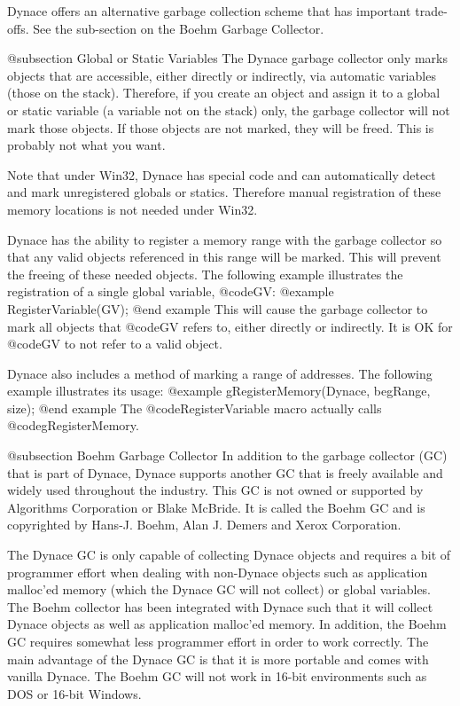 Dynace offers an alternative garbage collection scheme that has important
trade-offs.  See the sub-section on the Boehm Garbage Collector.



@subsection Global or Static Variables
The Dynace garbage collector only marks objects that are accessible, either
directly or indirectly, via automatic variables (those on the stack).
Therefore, if you create an object and assign it to a global or static
variable (a variable not on the stack) only, the garbage collector will
not mark those objects.  If those objects are not marked, they will be
freed.  This is probably not what you want.

Note that under Win32, Dynace has special code and can automatically
detect and mark unregistered globals or statics.  Therefore manual
registration of these memory locations is not needed under Win32.

Dynace has the ability to register a memory range with the garbage collector
so that any valid objects referenced in this range will be marked.  This
will prevent the freeing of these needed objects.  The following example
illustrates the registration of a single global variable, @code{GV}:
@example
        RegisterVariable(GV);
@end example
This will cause the garbage collector to mark all objects that @code{GV}
refers to, either directly or indirectly.  It is OK for @code{GV} to not
refer to a valid object.

Dynace also includes a method of marking a range of addresses.  The following
example illustrates its usage:
@example
        gRegisterMemory(Dynace, begRange, size);
@end example
The @code{RegisterVariable} macro actually calls @code{gRegisterMemory}.




@subsection Boehm Garbage Collector
In addition to the garbage collector (GC) that is part of Dynace,
Dynace supports another GC that is freely available and widely used
throughout the industry.  This GC is not owned or supported by
Algorithms Corporation or Blake McBride.  It is called the Boehm GC and is
copyrighted by Hans-J. Boehm, Alan J. Demers and Xerox Corporation.

The Dynace GC is only capable of collecting Dynace objects and requires
a bit of programmer effort when dealing with non-Dynace objects such as
application malloc'ed memory (which the Dynace GC will not collect) or
global variables.  The Boehm collector has been integrated with Dynace
such that it will collect Dynace objects as well as application
malloc'ed memory.  In addition, the Boehm GC requires somewhat less
programmer effort in order to work correctly.  The main advantage of the
Dynace GC is that it is more portable and comes with vanilla Dynace.
The Boehm GC will not work in 16-bit environments such as DOS or 16-bit
Windows.

